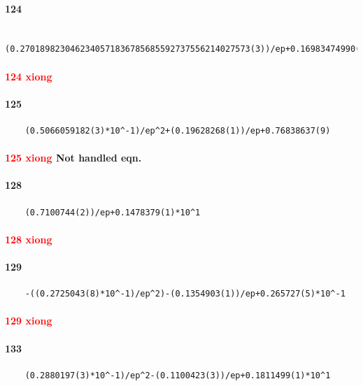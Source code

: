 \documentclass{article}
\newcommand{\WN}[1]{\textcolor{RawSienna}{#1}}
\newcommand{\WNNH}{\WN{Not handled eqn. }}
\begin{document}
\paragraph{124}
\begin{verbatim}
	(0.2701898230462340571836785685592737556214027573(3))/ep+0.16983474990(6)*10^1
\end{verbatim}
\paragraph{\textcolor{red}{124 xiong}}

\paragraph{125}
\begin{verbatim}
	(0.5066059182(3)*10^-1)/ep^2+(0.19628268(1))/ep+0.76838637(9)
\end{verbatim}
\paragraph{\textcolor{red}{125 xiong} \WNNH}
\paragraph{128}
\begin{verbatim}
	(0.7100744(2))/ep+0.1478379(1)*10^1
\end{verbatim}
\paragraph{\textcolor{red}{128	xiong}}

\paragraph{129}
\begin{verbatim}
	-((0.2725043(8)*10^-1)/ep^2)-(0.1354903(1))/ep+0.265727(5)*10^-1
\end{verbatim}
\paragraph{\textcolor{red}{129 xiong}}

\paragraph{133}
\begin{verbatim}
	(0.2880197(3)*10^-1)/ep^2-(0.1100423(3))/ep+0.1811499(1)*10^1
\end{verbatim}
\end{document}
